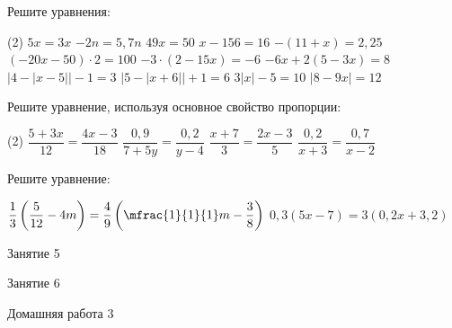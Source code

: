 \begin{homework}[number=2]
	\begin{listofex}
		\item Решите уравнения: %
		\begin{tasks}(2)
			\task \( 5x=3x \)
			\task \( -2n=5,7n \)
			\task \( 49x=50 \)
			\task \( x-156=16 \)
			\task \( -(11+x)=2,25 \)
			\task \( (-20x-50)\cdot 2 = 100 \)
			\task \( -3 \cdot (2-15x) = -6 \)
			\task \( -6x+2(5-3x)=8 \)
			\task \( |4-|x-5||-1=3 \)
			\task \( |5-|x+6||+1=6 \)
			\task \( 3|x|-5=10 \)
			\task \( |8-9x|=12 \)
		\end{tasks}
		\item Решите уравнение, используя основное свойство пропорции:
		\begin{tasks}(2)
			\task \( \dfrac{5+3x}{12} = \dfrac{4x-3}{18} \)
			\task \( \dfrac{0,9}{7+5y} = \dfrac{0,2}{y-4} \)
			\task \( \dfrac{x+7}{3} = \dfrac{2x-3}{5} \)
			\task \( \dfrac{0,2}{x+3} = \dfrac{0,7}{x-2} \)
		\end{tasks}
		\item Решите уравнение: %
		\begin{tasks}
			\task \( \dfrac{1}{3} \left( \dfrac{5}{12}-4m \right) =\dfrac{4}{9} \left(  \mfrac{1}{1}{1} m-\dfrac{3}{8} \right) \)
			\task \( 0,3(5x-7)=3(0,2x+3,2) \)
		\end{tasks}
	\end{listofex}
\end{homework}

\begin{class}[number=5]
	\begin{listofex}
		\item Занятие 5
	\end{listofex}
\end{class}

\begin{class}[number=6]
	\begin{listofex}
		\item Занятие 6
	\end{listofex}
\end{class}

\begin{homework}[number=3]
	\begin{listofex}
		\item Домашняя работа 3
	\end{listofex}
\end{homework}

